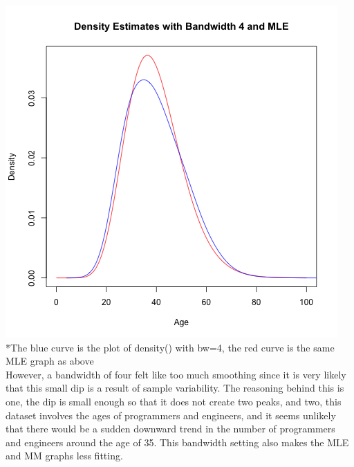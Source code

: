 \documentclass[12pt, letterpaper]{article}
\begin{document}
\includegraphics[scale=0.9]{prgeng_age_bandwidth_4}
\footnotesize
\\ \**The blue curve is the plot of density() with bw=4, the red curve is the same MLE graph as above \\
\normalsize
However, a bandwidth of four felt like too much smoothing since it is very likely that this small dip is a 
result of sample variability. The reasoning behind this is one, the dip is small enough so that it does 
not create two peaks, and two, this dataset involves the ages of programmers and engineers, and it seems 
unlikely that there would be a sudden downward trend in the number of programmers and engineers around the 
age of 35. This bandwidth setting also makes the MLE and MM graphs less fitting.

\newpage
\noindent
\end{document}
